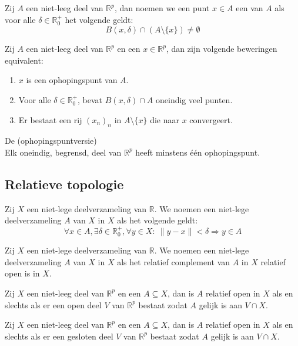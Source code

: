 \documentclass[main.tex]{subfiles}
\begin{document}
\begin{de}
  Zij $A$ een niet-leeg deel van $\mathbb{R}^{p}$, dan noemen we een punt $x\in A$ een  van $A$ als voor alle $\delta \in \mathbb{R}^{+}_{0}$ het volgende geldt:
  \[ B(x,\delta) \cap (A \setminus \{x\}) \neq \emptyset \]
\end{de}


\begin{pr}
  Zij $A$ een niet-leeg deel van $\mathbb{R}^{p}$ en een $x\in \mathbb{R}^{p}$, dan zijn volgende beweringen equivalent:
  \begin{enumerate}
  \item $x$ is een ophopingspunt van $A$.
  \item Voor alle $\delta \in \mathbb{R}_{0}^{+}$, bevat $B(x,\delta) \cap A$ oneindig veel punten.
  \item Er bestaat een rij $(x_{n})_{n}$ in $A\setminus \{ x\}$ die naar $x$ convergeert.
  \end{enumerate}
\end{pr}


\begin{st}
  De  (ophopingspuntversie)\\
  Elk oneindig, begrensd, deel van $\mathbb{R}^{p}$ heeft minstens \'e\'en ophopingspunt.
\end{st}

\subsection{Relatieve topologie}
\label{sec:relatieve-topologie}

\begin{de}
  Zij $X$ een niet-lege deelverzameling van $\mathbb{R}$.
  We noemen een niet-lege deelverzameling $A$ van $X$  in $X$ als het volgende geldt:
  \[ \forall x\in A, \exists \delta \in \mathbb{R}_{0}^{+}, \forall y\in X:\ \|y-x\| < \delta \Rightarrow y \in A \]
\end{de}

\begin{de}
  Zij $X$ een niet-lege deelverzameling van $\mathbb{R}$.
  We noemen een niet-lege deelverzameling $A$ van $X$  in $X$ als het relatief complement van $A$ in $X$ relatief open is in $X$.
\end{de}

\begin{pr}
  Zij $X$ een niet-leeg deel van $\mathbb{R}^{p}$ en een $A \subseteq X$, dan is $A$ relatief open in $X$ als en slechts als er een open deel $V$ van $\mathbb{R}^{p}$ bestaat zodat $A$ gelijk is aan $V \cap X$.
\end{pr}

\begin{pr}
  Zij $X$ een niet-leeg deel van $\mathbb{R}^{p}$ en een $A \subseteq X$, dan is $A$ relatief open in $X$ als en slechts als er een gesloten deel $V$ van $\mathbb{R}^{p}$ bestaat zodat $A$ gelijk is aan $V \cap X$.
\end{pr}
\end{document}
